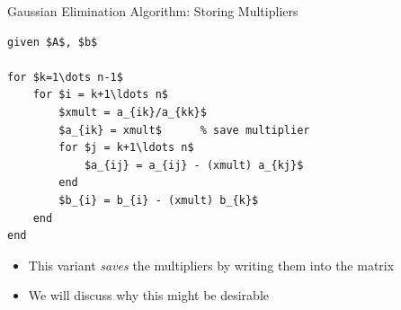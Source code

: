 \documentclass[10pt]{beamer}
\begin{document}
\begin{frame}[fragile]{Gaussian Elimination Algorithm: Storing Multipliers}
\begin{lstlisting}[mathescape,label=algo:fwdelim]
given $A$, $b$
                           
for $k=1\dots n-1$          
    for $i = k+1\ldots n$      
        $xmult = a_{ik}/a_{kk}$
        $a_{ik} = xmult$      % save multiplier
        for $j = k+1\ldots n$      
            $a_{ij} = a_{ij} - (xmult) a_{kj}$
        end                      
        $b_{i} = b_{i} - (xmult) b_{k}$
    end                        
end                          
\end{lstlisting}
\vspace{3mm}

\begin{itemize}
    \item This variant \textit{saves} the multipliers by writing them into the matrix 
    \item We will discuss why this might be desirable 
\end{itemize}

\end{frame}
\end{document}
